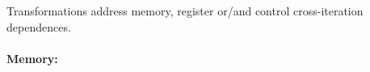 Transformations address memory, register or/and control
cross-iteration dependences.


\paragraph{Memory:}

%
%
%
%

